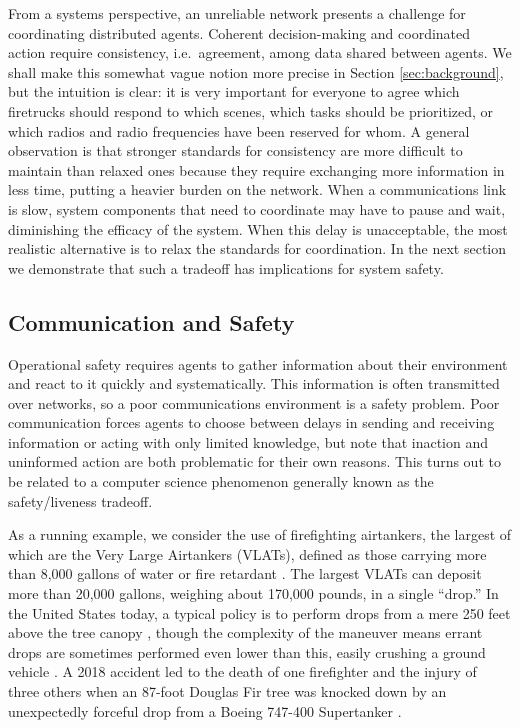 \documentclass[]             %
{NASA}                       %
\theoremstyle{definition}
\begin{document}
From a systems perspective, an unreliable network presents a challenge
for coordinating distributed agents. Coherent decision-making and
coordinated action require consistency, i.e.~agreement, among data
shared between agents. We shall make this somewhat vague notion more
precise in Section \ref{sec:background}, but the intuition is clear:
it is very important for everyone to agree which firetrucks should
respond to which scenes, which tasks should be prioritized, or which
radios and radio frequencies have been reserved for whom. A general
observation is that stronger standards for consistency are more
difficult to maintain than relaxed ones because they require
exchanging more information in less time, putting a heavier burden on
the network. When a communications link is slow, system components
that need to coordinate may have to pause and wait, diminishing the
efficacy of the system. When this delay is unacceptable, the most
realistic alternative is to relax the standards for coordination. In
the next section we demonstrate that such a tradeoff has implications
for system safety.

\subsection{Communication and Safety}
\label{communication-and-safety}
Operational safety requires agents to gather information about their
environment and react to it quickly and systematically. This
information is often transmitted over networks, so a poor
communications environment is a safety problem. Poor communication
forces agents to choose between delays in sending and receiving
information or acting with only limited knowledge, but note that
inaction and uninformed action are both problematic for their own
reasons. This turns out to be related to a computer science phenomenon
generally known as the safety/liveness tradeoff.

As a running example, we consider the use of firefighting airtankers,
the largest of which are the Very Large Airtankers (VLATs), defined as
those carrying more than 8,000 gallons of water or fire retardant
\cite{2019:airtankerops}. The largest VLATs can deposit more than
20,000 gallons, weighing about 170,000 pounds, in a single ``drop.''
In the United States today, a typical policy is to perform drops from
a mere 250 feet above the tree canopy \cite{2019:airtankerops}, though
the complexity of the maneuver means errant drops are sometimes
performed even lower than this, easily crushing a ground vehicle
\cite{2019:stickney}. A 2018 accident led to the death of one
firefighter and the injury of three others when an 87-foot Douglas Fir
tree was knocked down by an unexpectedly forceful drop from a Boeing
747-400 Supertanker \cite{2018:calfire}.
\end{document}
